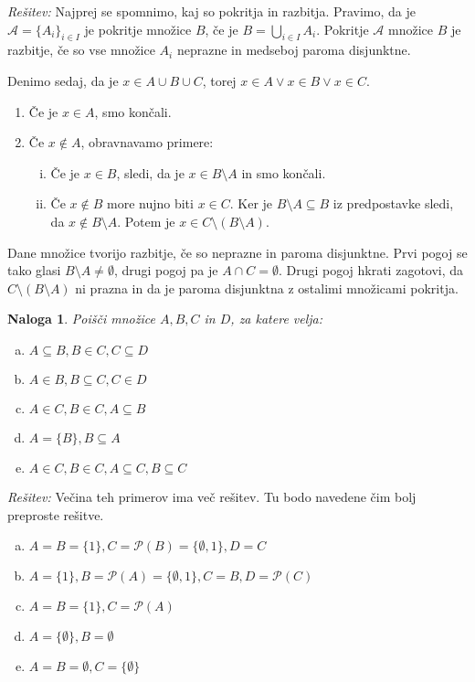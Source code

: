 \documentclass[a4paper, 10pt]{article}
\newtheorem{nal}{Naloga}
\newenvironment{resitev}{\begin{flushleft}\textit{Rešitev:}}{\hfill\end{flushleft}}
\begin{document}
	\begin{resitev}
		Najprej se spomnimo, kaj so pokritja in razbitja. Pravimo, da je $\mathcal{A} = \{A_i\}_{i\in I}$ je pokritje množice $B$, če je $B = \bigcup_{i\in I}A_i$. Pokritje $\mathcal{A}$ množice $B$ je razbitje, če so vse množice $A_i$ neprazne in medseboj paroma disjunktne.
		
		Denimo sedaj, da je $x\in A\cup B \cup C$, torej $x\in A \lor x\in B \lor x\in C$.
		\begin{enumerate}
			\item Če je $x\in A$, smo končali.
			\item Če $x\notin A$, obravnavamo primere: \begin{enumerate}[i.]
				\item Če je $x\in B$, sledi, da je $x\in B\setminus A$ in smo končali.
				\item Če $x\notin B$ more nujno biti $x\in C$. Ker je $B\setminus A \subseteq B$ iz predpostavke sledi, da $x\notin B\setminus A$. Potem je $x \in C\setminus (B\setminus A)$.
			\end{enumerate}
		\end{enumerate}
		Dane množice tvorijo razbitje, če so neprazne in paroma disjunktne. Prvi pogoj se tako glasi $B\setminus A \neq \emptyset$, drugi pogoj pa je $A\cap C = \emptyset$. Drugi pogoj hkrati zagotovi, da $C\setminus (B\setminus A)$ ni prazna in da je paroma disjunktna z ostalimi množicami pokritja.
	\end{resitev}
	\begin{nal}
		Poišči množice $A, B, C$ in $D$, za katere velja:
		\begin{enumerate}[a)]
			\item $A\subseteq B, B\in C, C \subseteq D$
			\item $A\in B, B \subseteq C, C\in D$
			\item $A\in C, B\in C, A \subseteq B$
			\item $A=\{B\}, B\subseteq A$
			\item $A\in C, B\in C, A\subseteq C, B\subseteq C$
		\end{enumerate}
	\end{nal}
	\begin{resitev}
		Večina teh primerov ima več rešitev. Tu bodo navedene čim bolj preproste rešitve.
		\begin{enumerate}[a)]
			\item $A = B = \{1\}, C= \mathcal{P}(B) = \{\emptyset, 1\}, D = C$
			\item $A = \{1\}, B = \mathcal{P}(A)= \{\emptyset, 1\}, C = B, D = \mathcal{P}(C)$
			\item $A = B = \{1\}, C = \mathcal{P}(A)$
			\item $A = \{\emptyset\}, B = \emptyset$
			\item $A = B = \emptyset, C = \{\emptyset\}$
		\end{enumerate}
	\end{resitev}
\end{document}
